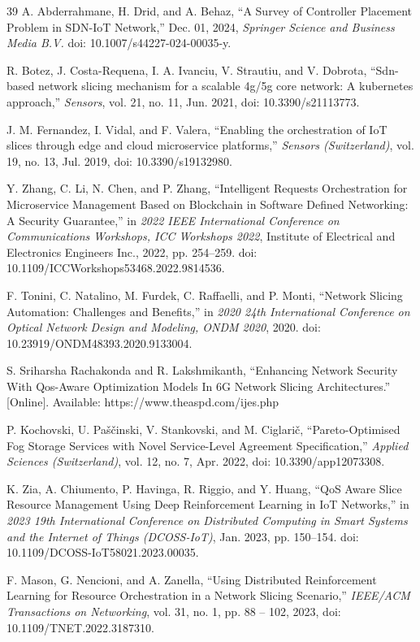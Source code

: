 \documentclass[conference]{IEEEtran}
\begin{document}
\begin{thebibliography}{39}
 A. Abderrahmane, H. Drid, and A. Behaz, ``A Survey of Controller Placement Problem in SDN-IoT Network,'' Dec. 01, 2024, \emph{Springer Science and Business Media B.V.} doi: 10.1007/s44227-024-00035-y.

 R. Botez, J. Costa-Requena, I. A. Ivanciu, V. Strautiu, and V. Dobrota, ``Sdn-based network slicing mechanism for a scalable 4g/5g core network: A kubernetes approach,'' \emph{Sensors}, vol. 21, no. 11, Jun. 2021, doi: 10.3390/s21113773.

 J. M. Fernandez, I. Vidal, and F. Valera, ``Enabling the orchestration of IoT slices through edge and cloud microservice platforms,'' \emph{Sensors (Switzerland)}, vol. 19, no. 13, Jul. 2019, doi: 10.3390/s19132980.

 Y. Zhang, C. Li, N. Chen, and P. Zhang, ``Intelligent Requests Orchestration for Microservice Management Based on Blockchain in Software Defined Networking: A Security Guarantee,'' in \emph{2022 IEEE International Conference on Communications Workshops, ICC Workshops 2022}, Institute of Electrical and Electronics Engineers Inc., 2022, pp. 254--259. doi: 10.1109/ICCWorkshops53468.2022.9814536.

 F. Tonini, C. Natalino, M. Furdek, C. Raffaelli, and P. Monti, ``Network Slicing Automation: Challenges and Benefits,'' in \emph{2020 24th International Conference on Optical Network Design and Modeling, ONDM 2020}, 2020. doi: 10.23919/ONDM48393.2020.9133004.

 S. Sriharsha Rachakonda and R. Lakshmikanth, ``Enhancing Network Security With Qos-Aware Optimization Models In 6G Network Slicing Architectures.'' {[}Online{]}. Available: https://www.theaspd.com/ijes.php

 P. Kochovski, U. Paščinski, V. Stankovski, and M. Ciglarič, ``Pareto-Optimised Fog Storage Services with Novel Service-Level Agreement Specification,'' \emph{Applied Sciences (Switzerland)}, vol. 12, no. 7, Apr. 2022, doi: 10.3390/app12073308.

 K. Zia, A. Chiumento, P. Havinga, R. Riggio, and Y. Huang, ``QoS Aware Slice Resource Management Using Deep Reinforcement Learning in IoT Networks,'' in \emph{2023 19th International Conference on Distributed Computing in Smart Systems and the Internet of Things (DCOSS-IoT)}, Jan. 2023, pp. 150--154. doi: 10.1109/DCOSS-IoT58021.2023.00035.

 F. Mason, G. Nencioni, and A. Zanella, ``Using Distributed Reinforcement Learning for Resource Orchestration in a Network Slicing Scenario,'' \emph{IEEE/ACM Transactions on Networking}, vol. 31, no. 1, pp. 88 -- 102, 2023, doi: 10.1109/TNET.2022.3187310.


\end{thebibliography}
\end{document}
